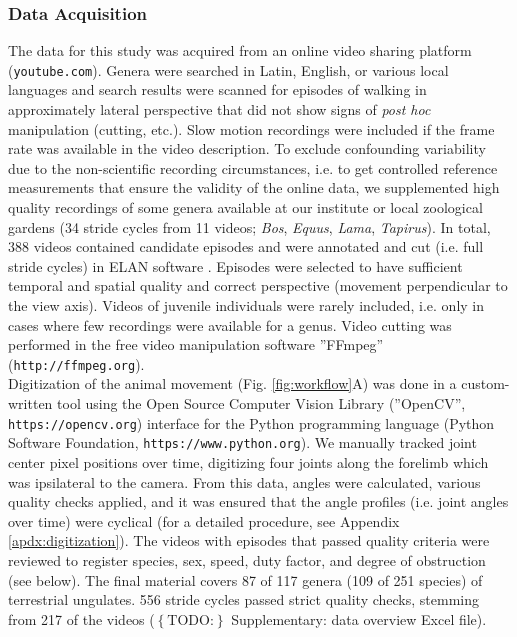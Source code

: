 \documentclass[10pt, a4paper]{article}
\newcommand{\todo}[1]{\colorbox{terracotta!30!yellow}{\footnotesize{$\left\lbrace\text{TODO:}\right\rbrace$ }#1\normalsize}}
\begin{document}
\subsubsection{Data Acquisition}
The data for this study was acquired from an online video sharing platform (\nolinkurl{youtube.com}). 
Genera were searched in Latin, English, or various local languages and search results were scanned for episodes of walking in approximately lateral perspective that did not show signs of \textit{post hoc} manipulation (cutting, etc.). 
Slow motion recordings were included if the frame rate was available in the video description. 
To exclude confounding variability due to the non-scientific recording circumstances, i.e. to get controlled reference measurements that ensure the validity of the online data, we supplemented high quality recordings of some genera available at our institute or local zoological gardens (34 stride cycles from 11 videos; \textit{Bos}, \textit{Equus}, \textit{Lama}, \textit{Tapirus}). 
In total, 388 videos contained candidate episodes and were annotated and cut (i.e. full stride cycles) in ELAN software \citep[Max Planck Institute for Psycholinguistics, Nijmegen;][]{Brugman2004}. 
Episodes were selected to have sufficient temporal and spatial quality and correct perspective (movement perpendicular to the view axis). 
Videos of juvenile individuals were rarely included, i.e. only in cases where few recordings were available for a genus. 
Video cutting was performed in the free video manipulation software ''FFmpeg'' (\nolinkurl{http://ffmpeg.org}). 
\\Digitization of the animal movement (Fig. \ref{fig:workflow}A) was done in a custom-written tool using the Open Source Computer Vision Library (''OpenCV'', \nolinkurl{https://opencv.org}) interface for the Python programming language (Python Software Foundation, \nolinkurl{https://www.python.org}). 
We manually tracked joint center pixel positions over time, digitizing four joints along the forelimb which was ipsilateral to the camera. 
From this data, angles were calculated, various quality checks applied, and it was ensured that the angle profiles (i.e. joint angles over time) were cyclical (for a detailed procedure, see Appendix \ref{apdx:digitization}). 
The videos with episodes that passed quality criteria were reviewed to register species, sex, speed, duty factor, and degree of obstruction (see below). 
The final material covers 87 of 117 genera (109 of 251 species) of terrestrial ungulates. 
556 stride cycles passed strict quality checks, stemming from 217 of the videos (\todo{Supplementary: data overview} Excel file). 
\end{document}
